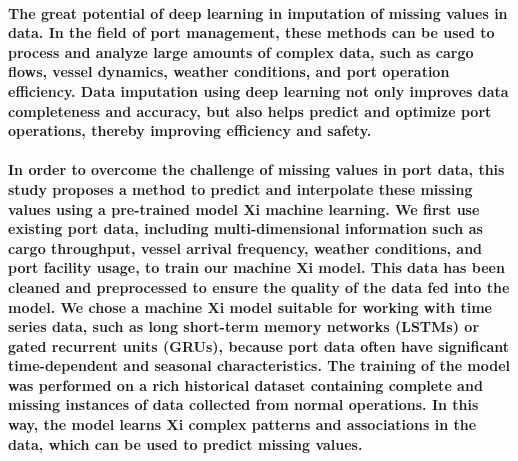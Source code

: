 \documentclass[11pt]{article} %
\begin{document}
\paragraph{The great potential of deep learning in imputation of missing values in data. In the field of port management, these methods can be used to process and analyze large amounts of complex data, such as cargo flows, vessel dynamics, weather conditions, and port operation efficiency. Data imputation using deep learning not only improves data completeness and accuracy, but also helps predict and optimize port operations, thereby improving efficiency and safety. \cite{9458712} \cite{wang2022deep} \cite{park2022longterm} \cite{camino2019improving}}
% 
% 
% 
% 
% 
% 
\paragraph{In order to overcome the challenge of missing values in port data, this study proposes a method to predict and interpolate these missing values using a pre-trained model Xi machine learning. We first use existing port data, including multi-dimensional information such as cargo throughput, vessel arrival frequency, weather conditions, and port facility usage, to train our machine Xi model. This data has been cleaned and preprocessed to ensure the quality of the data fed into the model.
We chose a machine Xi model suitable for working with time series data, such as long short-term memory networks (LSTMs) or gated recurrent units (GRUs), because port data often have significant time-dependent and seasonal characteristics. The training of the model was performed on a rich historical dataset containing complete and missing instances of data collected from normal operations. In this way, the model learns Xi complex patterns and associations in the data, which can be used to predict missing values.}
% 
% 
% 
% 
% 
% 
% 
% 
% 
% 
% 
% 
% 
% 
% 
% 
% 
% 
% 
% 
% 
% 
% 
% 
% 
% 
% 
% 
% 
% 
% 
% 
% 
% 
% 
% 
% 
% 


% 
% 
% 
% 
% 
% 
% 
% 
\end{document}

